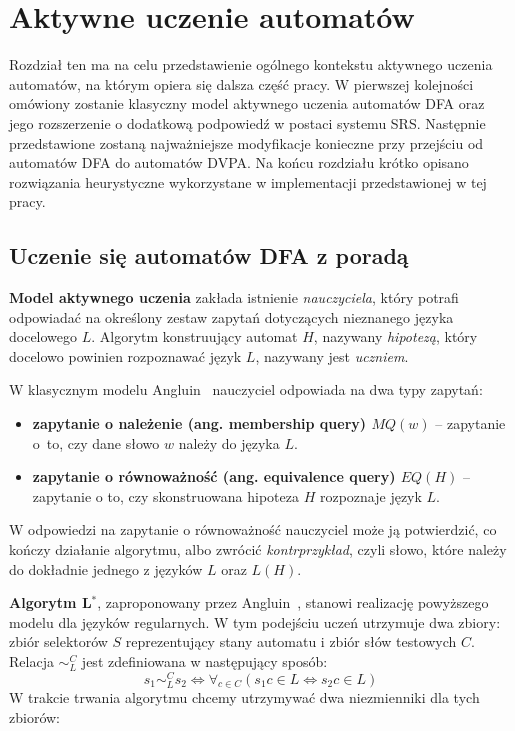 \chapter{Aktywne uczenie automatów}

Rozdział ten ma na celu przedstawienie ogólnego kontekstu aktywnego uczenia automatów, na którym opiera się dalsza
część pracy. W pierwszej kolejności omówiony zostanie klasyczny model aktywnego uczenia automatów DFA oraz jego rozszerzenie
o dodatkową podpowiedź w postaci systemu SRS. Następnie przedstawione zostaną najważniejsze modyfikacje
konieczne przy przejściu od automatów DFA do automatów DVPA. Na końcu rozdziału krótko opisano rozwiązania heurystyczne
wykorzystane w implementacji przedstawionej w tej pracy.

\section{Uczenie się automatów DFA z poradą}

\textbf{Model aktywnego uczenia} zakłada istnienie \emph{nauczyciela}, który potrafi odpowiadać na określony zestaw zapytań dotyczących nieznanego
języka docelowego $L$. Algorytm konstruujący automat $H$, nazywany \emph{hipotezą}, który docelowo powinien rozpoznawać język $L$, nazywany jest \emph{uczniem}.

W klasycznym modelu Angluin~\cite{Angluin} nauczyciel odpowiada na dwa typy zapytań:
\begin{itemize}
  \item \textbf{zapytanie o należenie (ang. membership query) $MQ(w)$} -- zapytanie o~to, czy dane słowo $w$ należy do języka $L$.
  \item \textbf{zapytanie o równoważność (ang. equivalence query) $EQ(H)$} --  zapytanie o to, czy skonstruowana hipoteza $H$ rozpoznaje język $L$.
\end{itemize}
W odpowiedzi na zapytanie o równoważność nauczyciel może ją potwierdzić, co kończy działanie algorytmu, albo zwrócić \emph{kontrprzykład},
czyli słowo, które należy do dokładnie jednego z języków $L$ oraz $L(H)$.

\textbf{Algorytm L$^*$}, zaproponowany przez Angluin~\cite{Angluin}, stanowi realizację powyższego modelu dla języków regularnych.
W tym podejściu uczeń utrzymuje dwa zbiory: zbiór selektorów $S$ reprezentujący stany automatu i zbiór słów testowych $C$.
Relacja $\sim^C_L$ jest zdefiniowana w następujący sposób:
$$s_1 \sim^C_L s_2 \Leftrightarrow \forall_{c\in C} (s_1c \in L \Leftrightarrow s_2c \in L)$$
W trakcie trwania algorytmu chcemy utrzymywać dwa niezmienniki dla tych zbiorów:

